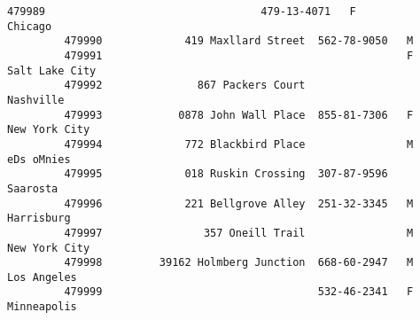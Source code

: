 \documentclass[11pt]{article}
\begin{document}
\begin{Verbatim}[commandchars=\\\{\}]
         479989                                  479-13-4071   F           Chicago   
         479990             419 Maxllard Street  562-78-9050   M                     
         479991                                                F    Salt Lake City   
         479992               867 Packers Court                          Nashville   
         479993            0878 John Wall Place  855-81-7306   F     New York City   
         479994             772 Blackbird Place                M        eDs oMnies   
         479995             018 Ruskin Crossing  307-87-9596              Saarosta   
         479996             221 Bellgrove Alley  251-32-3345   M        Harrisburg   
         479997                357 Oneill Trail                M     New York City   
         479998         39162 Holmberg Junction  668-60-2947   M       Los Angeles   
         479999                                  532-46-2341   F       Minneapolis   
         

\end{Verbatim}
\end{document}
